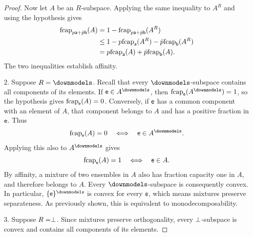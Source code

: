 \begin{mathSection}
\begin{proof}
		Now let $A$ be an $R$-subspace. Applying the same inequality to $A^R$ and using the hypothesis gives
		\begin{equation}
			\begin{aligned}
				\fcap_{p\ens[a]+\bar{p}\ens[b]}(A)
				&= 1-\fcap_{p\ens[a]+\bar{p}\ens[b]}(A^R) \\
				&\leq 1-p\fcap_{\ens[a]}(A^R)
				-\bar{p}\fcap_{\ens[b]}(A^R) \\
				&= p\fcap_{\ens[a]}(A)+\bar{p}\fcap_{\ens[b]}(A).
			\end{aligned}
		\end{equation}
		The two inequalities establish affinity.
		
		2. Suppose $R=\separate$. Recall that every $\separate$-subspace contains all components of its elements. If $\ens \in A^{\separate}$, then $\fcap_{\ens}(A^{\separate})=1$, so the hypothesis gives $\fcap_{\ens}(A)=0$. Conversely, if $\ens$ has a common component with an element of $A$, that component belongs to $A$ and has a positive fraction in $\ens$. Thus
		\begin{equation}
			\fcap_{\ens}(A)=0
			\quad\Longleftrightarrow\quad
			\ens \in A^{\separate}.
		\end{equation}
		Applying this also to $A^{\separate}$ gives
		\begin{equation}
			\fcap_{\ens}(A)=1
			\quad\Longleftrightarrow\quad
			\ens \in A.
		\end{equation}
		By affinity, a mixture of two ensembles in $A$ also has fraction capacity one in $A$, and therefore belongs to $A$. Every $\separate$-subspace is consequently convex. In particular, $\{\ens\}^{\separate}$ is convex for every $\ens$, which means mixtures preserve separateness. As previously shown, this is equivalent to monodecomposability.
		
		3. Suppose $R=\ortho$. Since mixtures preserve orthogonality, every $\ortho$-subspace is convex and contains all components of its elements.
		

\end{proof}
\end{mathSection}
